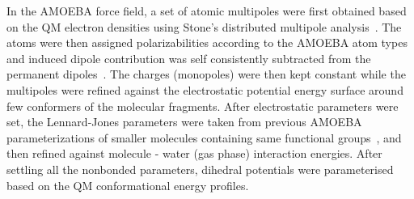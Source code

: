 \documentclass[journal=jacsat,manuscript=article,layout=singlecolumn]{achemso}
\begin{document}
In the AMOEBA force field, a set of atomic multipoles were first obtained based on the QM electron densities using Stone's distributed multipole analysis~\cite{Stone1981}. The atoms were then assigned polarizabilities according to the AMOEBA atom types and induced dipole contribution was self consistently subtracted from the permanent dipoles~\cite{shi2013proteinamoeba}. The charges (monopoles) were then kept constant while the multipoles were refined against the electrostatic potential energy surface around few conformers of the molecular fragments. %
After electrostatic parameters were set, the Lennard-Jones parameters were taken from previous AMOEBA parameterizations of smaller molecules containing same functional groups~\cite{Ren2011polorganic,shi2011hydration}, and then refined against molecule - water (gas phase) interaction energies. After settling all the nonbonded parameters, dihedral potentials were parameterised based on the QM conformational energy profiles.

\end{document}
